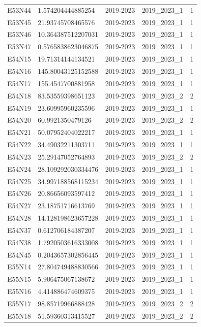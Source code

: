 \begin{landscape}
\begin{longtable}{lllll}
E53N44 & 1.574204444885254 & 2019-2023 & 2019\_2023\_1 & 1 \\
E53N45 & 21.93745708465576 & 2019-2023 & 2019\_2023\_1 & 1 \\
E53N46 & 10.364387512207031 & 2019-2023 & 2019\_2023\_1 & 1 \\
E53N47 & 0.5765838623046875 & 2019-2023 & 2019\_2023\_1 & 1 \\
E54N15 & 19.71314144134521 & 2019-2023 & 2019\_2023\_1 & 1 \\
E54N16 & 145.80043125152588 & 2019-2023 & 2019\_2023\_1 & 1 \\
E54N17 & 155.4547700881958 & 2019-2023 & 2019\_2023\_1 & 1 \\
E54N18 & 83.53559398651123 & 2019-2023 & 2019\_2023\_2 & 2 \\
E54N19 & 23.60995960235596 & 2019-2023 & 2019\_2023\_1 & 1 \\
E54N20 & 60.9921350479126 & 2019-2023 & 2019\_2023\_2 & 2 \\
E54N21 & 50.07952404022217 & 2019-2023 & 2019\_2023\_1 & 1 \\
E54N22 & 34.49032211303711 & 2019-2023 & 2019\_2023\_1 & 1 \\
E54N23 & 25.29147052764893 & 2019-2023 & 2019\_2023\_2 & 2 \\
E54N24 & 28.109292030334476 & 2019-2023 & 2019\_2023\_1 & 1 \\
E54N25 & 34.997188568115234 & 2019-2023 & 2019\_2023\_1 & 1 \\
E54N26 & 20.86656093597412 & 2019-2023 & 2019\_2023\_1 & 1 \\
E54N27 & 23.18751716613769 & 2019-2023 & 2019\_2023\_1 & 1 \\
E54N28 & 14.128198623657228 & 2019-2023 & 2019\_2023\_1 & 1 \\
E54N37 & 0.612706184387207 & 2019-2023 & 2019\_2023\_1 & 1 \\
E54N38 & 1.7920503616333008 & 2019-2023 & 2019\_2023\_1 & 1 \\
E54N45 & 0.2043657302856445 & 2019-2023 & 2019\_2023\_1 & 1 \\
E55N14 & 27.804749488830566 & 2019-2023 & 2019\_2023\_1 & 1 \\
E55N15 & 5.906475067138672 & 2019-2023 & 2019\_2023\_1 & 1 \\
E55N16 & 4.414886474609375 & 2019-2023 & 2019\_2023\_1 & 1 \\
E55N17 & 98.85719966888428 & 2019-2023 & 2019\_2023\_2 & 2 \\
E55N18 & 51.59360313415527 & 2019-2023 & 2019\_2023\_2 & 2 \\

\end{longtable}
\end{landscape}
